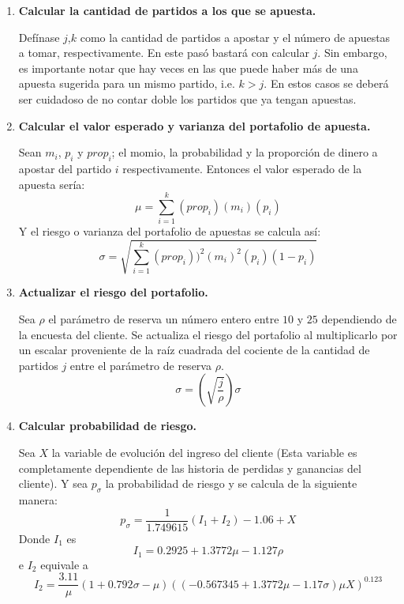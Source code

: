 \begin{enumerate}
	\item \textbf{Calcular la cantidad de partidos a los que se apuesta.}
	
	
Defínase $j$,$k$ como la cantidad de partidos a apostar y el número de apuestas a tomar, respectivamente.
En este pasó bastará con calcular $j$. Sin embargo, es importante notar que hay veces en las que puede haber más de una apuesta sugerida para un mismo partido, i.e. $k>j$. En estos casos se deberá ser cuidadoso de no contar doble los partidos que ya tengan apuestas.

	\item \textbf{Calcular el valor esperado y varianza del portafolio de apuesta.}
	
	
	Sean $m_i$, $p_i$ y $prop_i$; el momio, la probabilidad y la proporción de dinero a apostar del partido $i$ respectivamente. Entonces el valor esperado de la apuesta sería:
	\[\mu = \sum_{i=1}^{k}{(prop_i)(m_i)(p_i)}\]
	Y el riesgo o varianza del portafolio de apuestas se calcula así:
	\[\sigma = \sqrt{\sum_{i=1}^{k}{(prop_i))^2(m_i)^2(p_i)(1-p_i)}}\]
	
	
	\item \textbf{Actualizar el riesgo del portafolio.}
	
	
	Sea $\rho$ el parámetro de reserva un número entero entre $10$ y $25$ dependiendo de la encuesta del cliente. Se actualiza el riesgo del portafolio al multiplicarlo por un escalar proveniente de la raíz cuadrada del cociente de la cantidad de partidos $j$ entre el parámetro de reserva $\rho$.
	\[\sigma = \left(\sqrt{\frac{j}{\rho}}\right)\sigma\]
	

	\item \textbf{Calcular probabilidad de riesgo.}
	
	Sea $X$ la variable de evolución del ingreso del cliente (Esta variable es completamente dependiente de las historia de perdidas y ganancias del cliente). Y sea $p_\sigma$ la probabilidad de riesgo y se calcula de la siguiente manera:
	\[p_\sigma = \frac{1}{1.749615}(I_1 + I_2) - 1.06 + X\]
	Donde $I_1$ es
	\[I_1 = 0.2925 +1.3772\mu - 1.127\rho\]
	e $I_2$ equivale a
	\[I_2 = \frac{3.11}{\mu}(1 + 0.792\sigma - \mu)((-0.567345 + 1.3772\mu -1.17\sigma)\mu X)^{0.123}\]
	

\end{enumerate}
